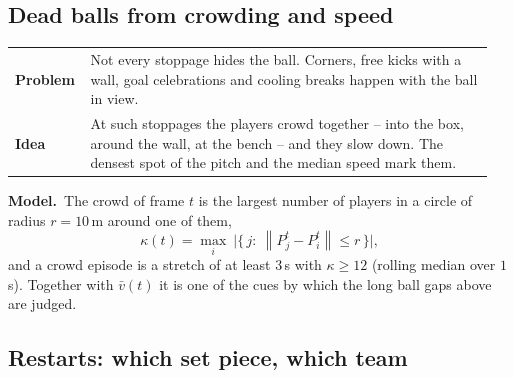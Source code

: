 \documentclass[11pt,a4paper]{article}
\makeatletter
\newcommand{\triple}[3]{%
  \par\medskip\noindent
  \begin{tabular}{@{}p{0.13\linewidth}@{\hspace{0.6em}}p{0.82\linewidth}@{}}
  \textbf{Problem} & #1\\[0.3em]
  \textbf{Idea}    & #2
  \end{tabular}\par\smallskip\noindent
  \textbf{Model.}\ #3\par\medskip}
\newcommand{\norm}[1]{\left\lVert #1 \right\rVert}
\makeatother
\begin{document}
\subsection{Dead balls from crowding and speed}\label{sec:crowd}

\triple{Not every stoppage hides the ball. Corners, free kicks with a wall, goal
celebrations and cooling breaks happen with the ball in view.}
{At such stoppages the players crowd together -- into the box, around the wall, at the
bench -- and they slow down. The densest spot of the pitch and the median speed mark them.}
{The crowd of frame $t$ is the largest number of players in a circle of radius $r=10$\,m
around one of them,
\begin{equation}
  \kappa(t)=\max_i\ \big|\{\,j:\ \norm{P_j^t-P_i^t}\le r\,\}\big| ,
\end{equation}
and a crowd episode is a stretch of at least $3$\,s with $\kappa\ge 12$ (rolling median over
$1$\,s). Together with $\bar v(t)$ it is one of the cues by which the long ball gaps above are
judged.}

\subsection{Restarts: which set piece, which team}\label{sec:restarts}
\end{document}
